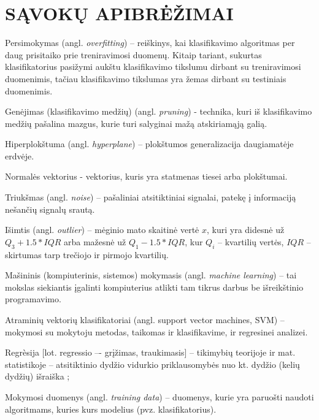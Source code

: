 \section*{SĄVOKŲ APIBRĖŽIMAI}

Persimokymas (angl. \textit{overfitting}) -- reiškinys, kai klasifikavimo algoritmas per daug prisitaiko prie treniravimosi duomenų. Kitaip tariant, sukurtas klasifikatorius pasižymi aukštu klasifikavimo tikslumu dirbant su treniravimosi duomenimis, tačiau klasifikavimo tikslumas yra žemas dirbant su testiniais duomenimis.

Genėjimas (klasifikavimo medžių)  (angl. \textit{pruning}) - technika, kuri iš klasifikavimo medžių pašalina mazgus, kurie turi salyginai mažą atskiriamąją galią.

Hiperplokštuma (angl. \textit{hyperplane}) -- plokštumos generalizacija daugiamatėje erdvėje.

Normalės vektorius - vektorius, kuris yra statmenas tiesei arba plokštumai.

Triukšmas (angl. \textit{noise}) -- pašaliniai atsitiktiniai signalai, patekę į informaciją nešančių signalų srautą.

Išimtis (angl. \textit{outlier}) -- mėginio mato skaitinė vertė $x$, kuri yra didesnė už $Q_3 + 1.5 * IQR$ arba mažesnė už $Q_1 - 1.5 * IQR$, kur $Q_i$ -- kvartilių vertės, $IQR$ -- skirtumas tarp trečiojo ir pirmojo kvartilių.

Mašininis (kompiuterinis, sistemos\cite{martisiute08}) mokymasis (angl. \textit{machine learning}) -- tai mokslas siekiantis įgalinti kompiuterius atlikti tam tikrus darbus be išreikštinio programavimo.

Atraminių vektorių klasifikatoriai (angl. support vector machines, SVM) -- mokymosi su mokytoju metodas, taikomas ir klasifikavime, ir regresinei analizei.\cite{bernataviciene08}

Regrèsija [lot. regressio –- grįžimas, traukimasis] -- tikimybių teorijoje ir mat. statistikoje – atsitiktinio dydžio vidurkio priklausomybės nuo kt. dydžio (kelių dydžių) išraiška \cite{tzz2010};

Mokymosi duomenys (angl. \textit{training data}) -- duomenys, kurie yra paruošti naudoti algoritmams, kuries kurs modelius (pvz. klasifikatorius).
